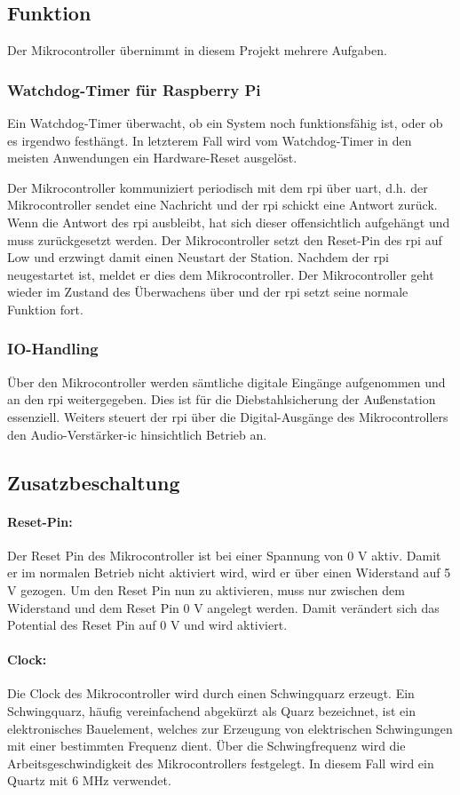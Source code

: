 \subsection{Funktion}
Der Mikrocontroller übernimmt in diesem Projekt mehrere Aufgaben.
\subsubsection{Watchdog-Timer für Raspberry Pi}
Ein Watchdog-Timer überwacht, ob ein System noch funktionsfähig ist, oder ob es irgendwo festhängt.
In letzterem Fall wird vom Watchdog-Timer in den meisten Anwendungen ein Hardware-Reset ausgelöst.\par

Der Mikrocontroller kommuniziert periodisch mit dem \ac{rpi} über \ac{uart}, d.h. der Mikrocontroller sendet eine Nachricht und der \ac{rpi} schickt eine Antwort zurück.
Wenn die Antwort des \ac{rpi} ausbleibt, hat sich dieser offensichtlich aufgehängt und muss zurückgesetzt werden.
Der Mikrocontroller setzt den Reset-Pin des \ac{rpi} auf Low und erzwingt damit einen Neustart der Station.
Nachdem der \ac{rpi} neugestartet ist, meldet er dies dem Mikrocontroller.
Der Mikrocontroller geht wieder im Zustand des Überwachens über und der \ac{rpi} setzt seine normale Funktion fort.

\subsubsection{IO-Handling}
Über den Mikrocontroller werden sämtliche digitale Eingänge aufgenommen und an den \ac{rpi} weitergegeben.
Dies ist für die Diebstahlsicherung der Außenstation essenziell.
Weiters steuert der \ac{rpi} über die Digital-Ausgänge des Mikrocontrollers den Audio-Verstärker-\ac{ic} hinsichtlich Betrieb an.

\subsection{Zusatzbeschaltung}
\paragraph{Reset-Pin:}
Der Reset Pin des Mikrocontroller ist bei einer Spannung von 0 V aktiv.
Damit er im normalen Betrieb nicht aktiviert wird, wird er über einen Widerstand auf 5 V gezogen.
Um den Reset Pin nun zu aktivieren, muss nur zwischen dem Widerstand und dem Reset Pin 0 V angelegt werden.
Damit verändert sich das Potential des Reset Pin auf 0 V und wird aktiviert.

\paragraph{Clock:}
Die Clock des Mikrocontroller wird durch einen Schwingquarz erzeugt.
Ein Schwingquarz, häufig vereinfachend abgekürzt als Quarz bezeichnet, ist ein elektronisches Bauelement, welches zur Erzeugung von elektrischen Schwingungen mit einer bestimmten Frequenz dient.
Über die Schwingfrequenz wird die Arbeitsgeschwindigkeit des Mikrocontrollers festgelegt.
In diesem Fall wird ein Quartz mit 6 MHz verwendet.